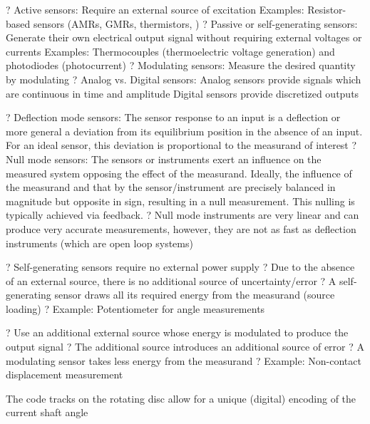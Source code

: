 \documentclass[2pt,landscape]{article}
\begin{document}
\begin{multicols*}{5}
?	Active sensors:
Require an external source of excitation 
Examples:
\textbullet 	Resistor-based sensors (AMRs, GMRs, thermistors, \textbullet )
?	Passive or self-generating sensors:
Generate their own electrical output signal without requiring external 
voltages or currents
Examples:
\textbullet 	Thermocouples (thermoelectric voltage generation) and photodiodes 
(photocurrent)
?	Modulating sensors:
Measure the desired quantity by modulating
?	Analog vs. Digital sensors:
\textbullet 	Analog sensors provide signals which are continuous in time and 
amplitude
\textbullet 	Digital sensors provide discretized outputs



?	Deflection mode sensors:
\textbullet 	The sensor response to an input is a \textbullet deflection\textbullet 
or more general a deviation from its equilibrium 
position in the absence of an input. For an ideal 
sensor, this deviation is proportional to the 
measurand of interest
?	Null mode sensors:
\textbullet 	The sensors or instruments exert an influence on 
the measured system opposing the effect of the 
measurand. Ideally, the influence of the measurand 
and that by the sensor/instrument are precisely 
balanced in magnitude but opposite in sign, 
resulting in a null measurement. This nulling is 
typically achieved via feedback.
?	Null mode instruments are very linear and can produce very accurate 
measurements, however, they are not as fast as deflection instruments 
(which are open loop systems)



?	Self-generating sensors require no external power supply
?	Due to the absence of an external source, there is no additional source 
of uncertainty/error
?	A self-generating sensor draws all its required energy from the 
measurand (source loading)
?	Example: Potentiometer for angle measurements




?	Use an additional external source whose energy is modulated to 
produce the output signal
?	The additional source introduces an additional source of error
?	A modulating sensor takes less energy from the measurand
?	Example: Non-contact displacement measurement












The code tracks on the rotating disc 
allow for a unique (digital) encoding of 
the current shaft angle






\end{multicols*}
\end{document}
